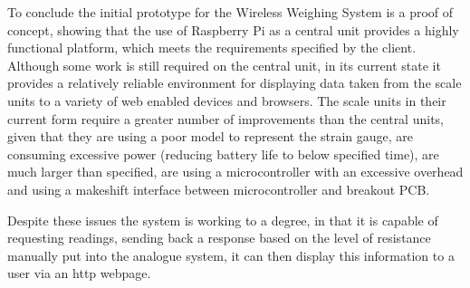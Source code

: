 To conclude the initial prototype for the Wireless Weighing System is a proof of concept, showing that the use of Raspberry Pi as a central unit provides a highly functional platform, which meets the requirements specified by the client. Although some work is still required on the central unit, in its current state it provides a relatively reliable environment for displaying data taken from the scale units to a variety of web enabled devices and browsers. The scale units in their current form require a greater number of improvements than the central units, given that they are using a poor model to represent the strain gauge, are consuming excessive power (reducing battery life to below specified time), are much larger than specified, are using a microcontroller with an excessive overhead and using a makeshift interface between microcontroller and breakout PCB. 

Despite these issues the system is working to a degree, in that it is capable of requesting readings, sending back a response based on the level of resistance manually put into the analogue system, it can then display this information to a user via an http webpage.  

